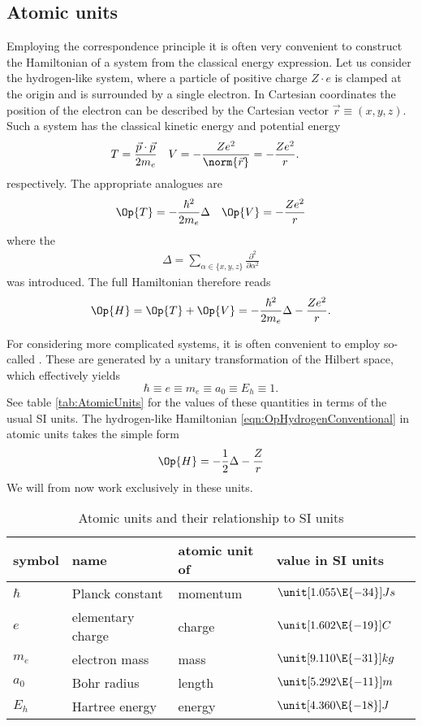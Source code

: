 \subsection{Atomic units}
Employing the correspondence principle it is often very convenient
to construct the \QM Hamiltonian of a system from the classical energy expression.
Let us consider the hydrogen-like system,
where a particle of positive charge $Z \cdot e$
is clamped at the origin and is surrounded by a single electron.
In Cartesian coordinates the position of the electron can be described by the Cartesian
vector $\vec{r} \equiv (x, y, z)$.
Such a system has the classical kinetic energy and potential energy
\begin{align*}
	T &= \frac{\vec{p} \cdot \vec{p}}{2 m_e} & V &= - \frac{Ze^2}{\norm{\vec{r}}} = - \frac{Ze^2}{r}.
\end{align*}
respectively. The appropriate \QM analogues are
\begin{align}
	\Op{T} &= -\frac{\hbar^2}{2 m_e} \Delta & \Op{V} = - \frac{Ze^2}{r}
	\label{eqn:OpHydrogenConventional}
\end{align}
where the 
\begin{align}
	\Delta = \sum_{\alpha \in \{x,y,z\}} \frac{\partial^2}{\partial \alpha^2}
	\label{eqn:LaplaceOperatorHydrogen}
\end{align}
was introduced. The full Hamiltonian therefore reads
\[ \Op{H} = \Op{T} + \Op{V} = -\frac{\hbar^2}{2 m_e} \Delta - \frac{Ze^2}{r}. \]

For considering more complicated systems,
it is often convenient to employ so-called .
These are generated by a unitary transformation of the Hilbert space,
which effectively yields
\[ \hbar \equiv e \equiv m_e \equiv a_0 \equiv E_h \equiv 1. \]
See table \vref{tab:AtomicUnits} for the values of these quantities
in terms of the usual SI units.
The hydrogen-like Hamiltonian \vref{eqn:OpHydrogenConventional}
in atomic units takes the simple form
\begin{equation}
	\Op{H} = -\frac12 \Delta - \frac{Z}{r}
	\label{eqn:OpHydrogen}
\end{equation}
We will from now work exclusively in these units.
\begin{table}
	\centering
	\begin{tabular}{lllll}
		\toprule
		symbol & name & atomic unit of & value in SI units \\
		\midrule
		$\hbar$ & Planck constant & momentum & $\unit[1.055\E{-34}]{Js}$ \\
		$e$ & elementary charge & charge & $\unit[1.602\E{-19}]{C}$ \\
		$m_e$ & electron mass & mass & $\unit[9.110\E{-31}]{kg}$ \\
		$a_0$ & Bohr radius & length & $\unit[5.292\E{-11}]{m}$ \\
		$E_h$ & Hartree energy & energy & $\unit[4.360\E{-18}]{J}$ \\
		\bottomrule
	\end{tabular}
	\caption{Atomic units and their relationship to SI units}
	\label{tab:AtomicUnits}
\end{table}
